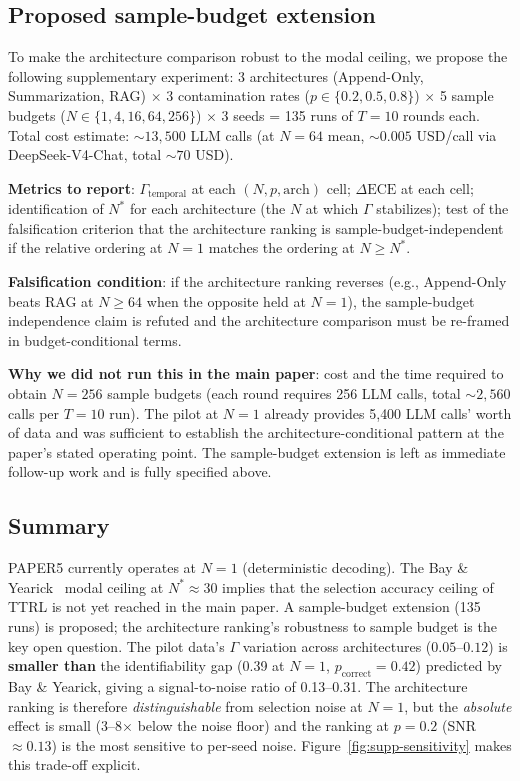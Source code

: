 \documentclass[11pt]{article}
\begin{document}
\subsection{Proposed sample-budget extension}

To make the architecture comparison robust to the modal ceiling, we propose the following supplementary experiment: 3 architectures (Append-Only, Summarization, RAG) $\times$ 3 contamination rates ($p \in \{0.2, 0.5, 0.8\}$) $\times$ 5 sample budgets ($N \in \{1, 4, 16, 64, 256\}$) $\times$ 3 seeds = 135 runs of $T{=}10$ rounds each. Total cost estimate: $\sim 13{,}500$ LLM calls (at $N{=}64$ mean, $\sim 0.005$ USD/call via DeepSeek-V4-Chat, total $\sim 70$ USD).

\textbf{Metrics to report}: $\Gamma_{\mathrm{temporal}}$ at each $(N, p, \mathrm{arch})$ cell; $\Delta\mathrm{ECE}$ at each cell; identification of $N^*$ for each architecture (the $N$ at which $\Gamma$ stabilizes); test of the falsification criterion that the architecture ranking is sample-budget-independent if the relative ordering at $N{=}1$ matches the ordering at $N \geq N^*$.

\textbf{Falsification condition}: if the architecture ranking reverses (e.g., Append-Only beats RAG at $N \geq 64$ when the opposite held at $N{=}1$), the sample-budget independence claim is refuted and the architecture comparison must be re-framed in budget-conditional terms.

\textbf{Why we did not run this in the main paper}: cost and the time required to obtain $N{=}256$ sample budgets (each round requires 256 LLM calls, total $\sim 2{,}560$ calls per $T{=}10$ run). The pilot at $N{=}1$ already provides 5{,}400 LLM calls' worth of data and was sufficient to establish the architecture-conditional pattern at the paper's stated operating point. The sample-budget extension is left as immediate follow-up work and is fully specified above.

\subsection{Summary}

PAPER5 currently operates at $N{=}1$ (deterministic decoding). The Bay \& Yearick~\cite{bay2026sampling} modal ceiling at $N^* \approx 30$ implies that the selection accuracy ceiling of TTRL is not yet reached in the main paper. A sample-budget extension (135 runs) is proposed; the architecture ranking's robustness to sample budget is the key open question. The pilot data's $\Gamma$ variation across architectures ($0.05$--$0.12$) is \textbf{smaller than} the identifiability gap (0.39 at $N{=}1$, $p_{\mathrm{correct}} = 0.42$) predicted by Bay \& Yearick, giving a signal-to-noise ratio of 0.13--0.31. The architecture ranking is therefore \emph{distinguishable} from selection noise at $N{=}1$, but the \emph{absolute} effect is small (3--8$\times$ below the noise floor) and the ranking at $p{=}0.2$ (SNR $\approx 0.13$) is the most sensitive to per-seed noise. Figure~\ref{fig:supp-sensitivity} makes this trade-off explicit.
\end{document}
